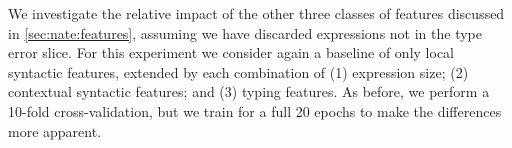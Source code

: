 We investigate the relative impact of the other
three classes of features discussed in \autoref{sec:nate:features}, assuming
we have discarded expressions not in the type error slice.
%
For this experiment we consider again a baseline of only local syntactic
features, extended by each combination of
%
(1) expression size;
(2) contextual syntactic features; and
(3) typing features.
%
As before, we perform a 10-fold cross-validation,
but we train for a full 20 epochs to make the differences more apparent.
%
